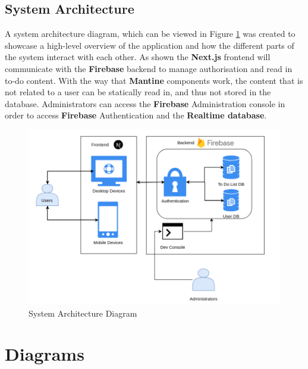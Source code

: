 \documentclass{l4proj}
\begin{document}
\subsection{System Architecture}
A system architecture diagram,  which can be viewed in Figure \ref{fig:systemArchitecture} was created to showcase a high-level overview of the application and how the different parts of the system interact with each other. As shown the \textbf{Next.js} frontend will communicate with the \textbf{Firebase} backend to manage authorisation and read in to-do content. With the way that \textbf{Mantine} components work,  the content that is not related to a user can be statically read in,  and thus not stored in the database. Administrators can access the \textbf{Firebase} Administration console in order to access \textbf{Firebase} Authentication and the \textbf{Realtime database}.

\begin{figure}[ht]
    \centering
    \includegraphics[width=0.8\linewidth]{images/system_architecture.pdf}    

    \caption{System Architecture Diagram
    }

    \label{fig:systemArchitecture} 
\end{figure}

\section{Diagrams}
\end{document}

